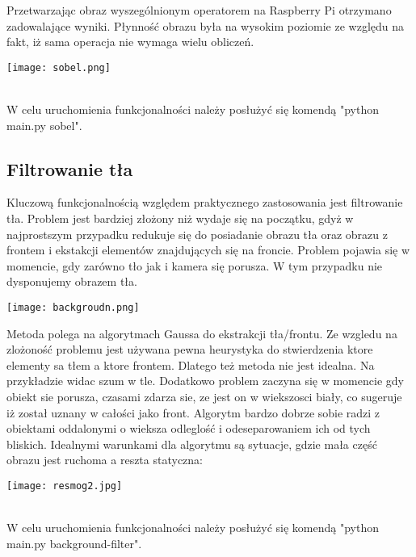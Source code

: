 \documentclass{article}
\begin{document}
Przetwarzając obraz wyszególnionym operatorem na Raspberry Pi otrzymano zadowalające wyniki. Płynność obrazu była na wysokim poziomie ze względu na fakt, iż sama operacja nie wymaga wielu obliczeń.

\begin{center}
    \texttt{[image: sobel.png]}
\end{center}

\\
W celu uruchomienia funkcjonalności należy posłużyć się komendą "python main.py sobel".

\subsection{Filtrowanie tła}
Kluczową funkcjonalnością względem praktycznego zastosowania jest filtrowanie tła. Problem jest bardziej złożony niż wydaje się na początku, gdyż w najprostszym przypadku redukuje się do posiadanie obrazu tła oraz obrazu z frontem i ekstakcji elementów znajdujących się na froncie. Problem pojawia się w momencie, gdy zarówno tło jak i kamera się porusza. W tym przypadku nie dysponujemy obrazem tła.

\begin{center}
    \texttt{[image: backgroudn.png]}
\end{center}

Metoda polega na algorytmach Gaussa do ekstrakcji tła/frontu. Ze wzgledu na zlożoność problemu jest używana pewna heurystyka do stwierdzenia ktore elementy sa tłem a ktore frontem. Dlatego też metoda nie jest idealna. Na przykładzie widac szum w tle. Dodatkowo problem zaczyna się w momencie gdy obiekt sie porusza, czasami zdarza sie, ze jest on w wiekszosci biały, co sugeruje iż został uznany w całości jako front. Algorytm bardzo dobrze sobie radzi z obiektami oddalonymi o wieksza odleglość i odeseparowaniem ich od tych bliskich. Idealnymi warunkami dla algorytmu są sytuacje, gdzie mała część obrazu jest ruchoma a reszta statyczna:

\begin{center}
    \texttt{[image: resmog2.jpg]}
\end{center}

\\
W celu uruchomienia funkcjonalności należy posłużyć się komendą "python main.py background-filter".
\end{document}
